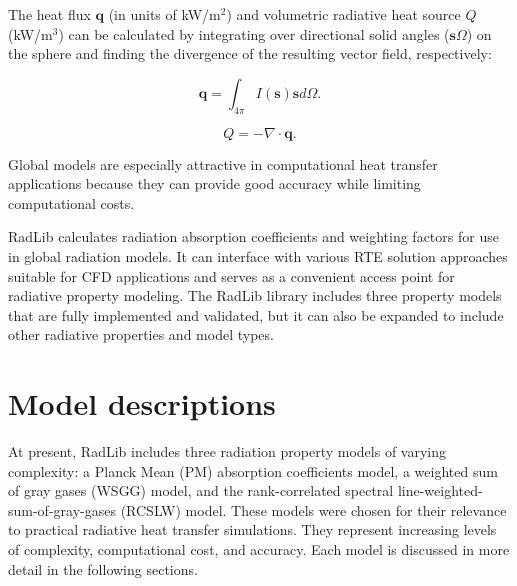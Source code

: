 \documentclass[preprint,12pt]{elsarticle}
\newcounter{bla}
\begin{document}
The heat flux $\mathbf{q}$ (in units of kW/m$^2$) and volumetric radiative heat source $Q$ (kW/m$^3$) can be calculated by integrating over directional solid angles ($\mathbf{s}\Omega$) on the sphere and finding the divergence of the resulting vector field, respectively:
%
\begin{linenomath}
\begin{equation}
    \mathbf{q} = \int_{4\pi}I(\mathbf{s})\mathbf{s}d\Omega.
\end{equation}
\end{linenomath}
%
\begin{linenomath}
\begin{equation}
    Q = -\nabla\cdot\mathbf{q}.
\end{equation}
\end{linenomath}
%
Global models are especially attractive in computational heat transfer applications because they can provide good accuracy while limiting computational costs.

RadLib calculates radiation absorption coefficients and weighting factors for use in global radiation models. It can interface with various RTE solution approaches suitable for CFD applications and serves as a convenient access point for radiative property modeling. The RadLib library includes three property models that are fully implemented and validated, but it can also be expanded to include other radiative properties and model types.


\section{Model descriptions} \label{s:models}

At present, RadLib includes three radiation property models of varying complexity: a Planck Mean (PM) absorption coefficients model, a weighted sum of gray gases (WSGG) model, and the rank-correlated spectral line-weighted-sum-of-gray-gases (RCSLW) model.
These models were chosen for their relevance to practical radiative heat transfer simulations. They represent increasing levels of complexity, computational cost, and accuracy. Each model is discussed in more detail in the following sections.
\end{document}
